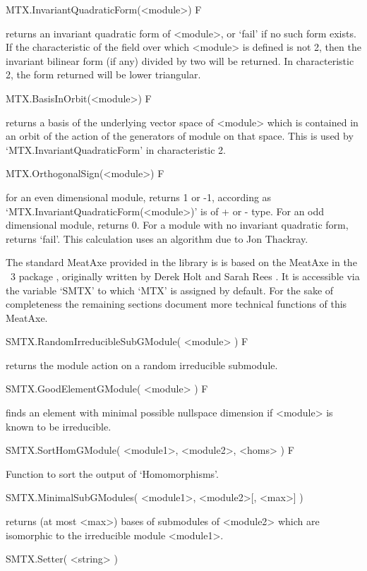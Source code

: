 \>MTX.InvariantQuadraticForm(<module>) F

returns an invariant quadratic form of <module>,
or `fail' if no such form exists. If the characteristic of the field over
which <module> is defined is not 2, then the invariant bilinear form (if
any) divided by two will be returned. In characteristic 2, the form
returned will be lower triangular.

\>MTX.BasisInOrbit(<module>) F

returns a basis of the underlying vector space of <module> which is contained
in an orbit of the action of the generators of module on that space. This is
used by `MTX.InvariantQuadraticForm' in characteristic 2.

\>MTX.OrthogonalSign(<module>) F

for an even dimensional module, returns 1 or -1, according as
`MTX.InvariantQuadraticForm(<module>)' is of + or - type. For an odd
dimensional module, returns 0. For a module with no invariant
quadratic form, returns `fail'. This calculation uses an algorithm due
to Jon Thackray.


The standard MeatAxe provided in the {\GAP} library is
is based on the MeatAxe in the {\GAP}~3 package ,
originally written by Derek Holt and Sarah Rees \cite{HR94}. It is
accessible via the variable `SMTX' to which `MTX' is assigned by default. 
For the sake of completeness the remaining sections document more technical
functions of this MeatAxe.

\>SMTX.RandomIrreducibleSubGModule( <module> ) F

returns the module action on a random irreducible submodule.

\>SMTX.GoodElementGModule( <module> ) F

finds an element with minimal possible nullspace dimension if <module>
is known to be irreducible.

\>SMTX.SortHomGModule( <module1>, <module2>, <homs> ) F

Function to sort the output of `Homomorphisms'.

\>SMTX.MinimalSubGModules( <module1>, <module2>[, <max>] )

returns (at most <max>) bases of submodules of <module2> which are
isomorphic to the irreducible module  <module1>.

\>SMTX.Setter( <string> )

